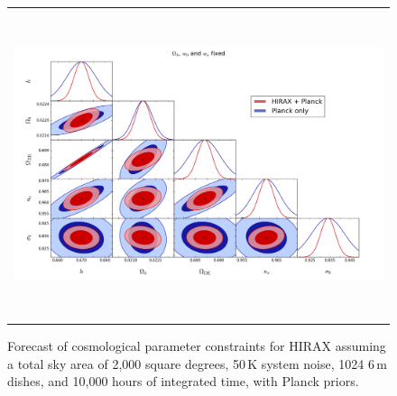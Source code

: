 \documentclass[]{spie}  %
\begin{document}
    \begin{figure} [t]
   \begin{center}
   \begin{tabular}{c} %
  \includegraphics[height=9cm]{5pellipses_justHIRAX1.png}
   \end{tabular}
   \end{center}
   \caption[dish] 
   { \label{fig:params} 
Forecast of cosmological parameter constraints for HIRAX assuming a total sky area of 2,000 square degrees, 50\,K system noise, 1024 6\,m dishes, and 10,000 hours of integrated time, with Planck priors.}
   \end{figure} 
\end{document}

